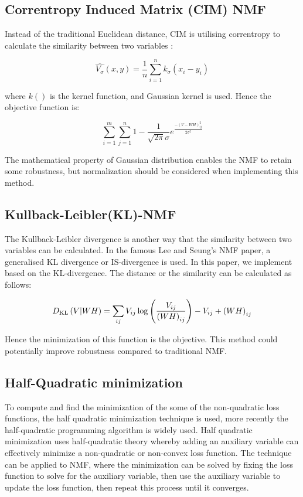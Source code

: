\documentclass{article} %
\begin{document}
\subsection{Correntropy Induced Matrix (CIM) NMF}
Instead of the traditional Euclidean distance, CIM is utilising correntropy to calculate the similarity between two variables \cite{liu-pokharel-principe}:

\begin{equation}
\hat{V_\sigma}\left(x,y\right) = \frac{1}{n}\sum_{i=1}^{n}k_\sigma\left(x_i - y_i\right)
\end{equation}

where $k\left(\right)$ is the kernel function, and Gaussian kernel is used. Hence the objective function is:

\begin{equation}
\sum_{i=1}^{m}\sum_{j=1}^{n} 1 - \frac{1}{\sqrt{2\pi}\sigma}e^\frac{-\left(V - WH\right)_{ij}^2}{2\sigma^2}
\end{equation}

The mathematical property of Gaussian distribution enables the NMF to retain some robustness, but normalization should be considered when implementing this method. \cite{du-li-shen}

\subsection{Kullback-Leibler(KL)-NMF}
The Kullback-Leibler divergence is another way that the similarity between two variables can be calculated. \cite{fevotte-idier} In the famous Lee and Seung’s NMF paper, a generalised KL divergence or IS-divergence is used. In this paper, we implement based on the KL-divergence. The distance or the similarity can be calculated as follows:

\begin{equation}
D_{\textup{KL}}\left(V|WH\right) = \sum_{ij}V_{ij} \log\left(\frac{V_{ij}}{\left(WH\right)_{ij}}\right) - V_{ij} + \left(WH\right)_{ij}
\end{equation}

Hence the minimization of this function is the objective. This method could potentially improve robustness compared to traditional NMF. \cite{finesso-spreij}

\subsection{Half-Quadratic minimization}
To compute and find the minimization of the some of the non-quadratic loss functions, the half quadratic minimization technique is used, more recently the half-quadratic programming algorithm is widely used. \cite{geman-chengda} Half quadratic minimization uses half-quadratic theory \cite{nikolova-chan} whereby adding an auxiliary variable can effectively minimize a non-quadratic or non-convex loss function. The technique can be applied to NMF, where the minimization can be solved by fixing the loss function to solve for the auxiliary variable, then use the auxiliary variable to update the loss function, then repeat this process until it converges. \cite{du-li-shen}
\end{document}
